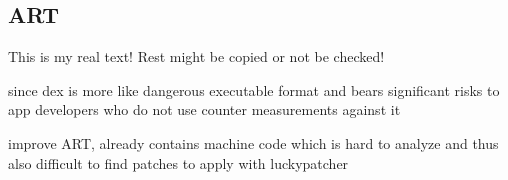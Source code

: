 \subsection{ART} \label{subsection:counter-external-art}
This is my real text! Rest might be copied or not be checked!

since dex is more like dangerous executable format and bears significant risks to app developers who do not use counter measurements against it

improve ART, already contains machine code which is hard to analyze and thus also difficult to find patches to apply with luckypatcher
